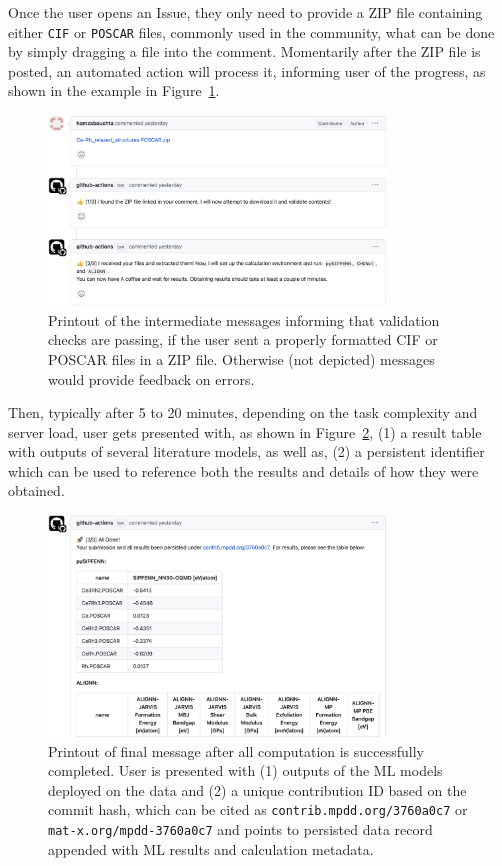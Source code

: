 Once the user opens an Issue, they only need to provide a ZIP file containing either \texttt{CIF} \cite{Hall1991TheCrystallography} or \texttt{POSCAR} \cite{VASPPOSCAR} files, commonly used in the community, what can be done by simply dragging a file into the comment. Momentarily after the ZIP file is posted, an automated action will process it, informing user of the progress, as shown in the example in Figure~\ref{mpdd:fig:mpddx2}.

\begin{figure}[H]
    \centering
    \includegraphics[width=0.8\textwidth]{mpdd/mpddx2.png}
    \caption{Printout of the intermediate messages informing that validation checks are passing, if the user sent a properly formatted CIF or POSCAR files in a ZIP file. Otherwise (not depicted) messages would provide feedback on errors.}
    \label{mpdd:fig:mpddx2}
\end{figure}

Then, typically after 5 to 20 minutes, depending on the task complexity and server load, user gets presented with, as shown in Figure~\ref{mpdd:fig:mpddx3}, (1) a result table with outputs of several literature models, as well as, (2) a persistent identifier which can be used to reference both the results and details of how they were obtained.

\begin{figure}[H]
    \centering
    \includegraphics[width=0.8\textwidth]{mpdd/mpddx3.png}
    \caption{Printout of final message after all computation is successfully completed. User is presented with (1) outputs of the ML models deployed on the data and (2) a unique contribution ID based on the commit hash, which can be cited as \texttt{contrib.mpdd.org/3760a0c7} or \texttt{mat-x.org/mpdd-3760a0c7} and points to persisted data record appended with ML results and calculation metadata.}
    \label{mpdd:fig:mpddx3}
\end{figure}

